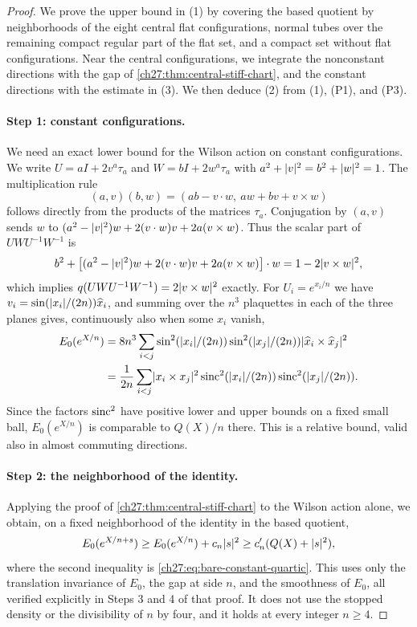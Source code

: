 \begin{proof}
We prove the upper bound in (1) by covering the based quotient by neighborhoods of the eight central flat configurations, normal tubes over the remaining compact regular part of the flat set, and a compact set without flat configurations. Near the central configurations, we integrate the nonconstant directions with the gap of \cref{ch27:thm:central-stiff-chart}, and the constant directions with the estimate in (3). We then deduce (2) from (1), (P1), and (P3).

\paragraph{Step 1: constant configurations.}
We need an exact lower bound for the Wilson action on constant configurations. We write $U=aI+2v^a\tau_a$ and $W=bI+2w^a\tau_a$ with $a^2+\lvert v\rvert^2=b^2+\lvert w\rvert^2=1$. The multiplication rule
\[
 (a,v)(b,w)=(ab-v\cdot w,\ aw+bv+v\times w)
\]
follows directly from the products of the matrices $\tau_a$. Conjugation by $(a,v)$ sends $w$ to $(a^2-\lvert v\rvert^2)w+2(v\cdot w)v+2a(v\times w)$. Thus the scalar part of $UWU^{-1}W^{-1}$ is
\[
 b^2+\bigl[(a^2-\lvert v\rvert^2)w+2(v\cdot w)v+2a(v\times w)\bigr]\cdot w=1-2\lvert v\times w\rvert^2,
\]
which implies $q(UWU^{-1}W^{-1})=2\lvert v\times w\rvert^2$ exactly. For $U_i=e^{x_i/n}$ we have $v_i=\sin(\lvert x_i\rvert/(2n))\widehat x_i$, and summing over the $n^3$ plaquettes in each of the three planes gives, continuously also when some $x_i$ vanish,
\begin{equation}\label{ch27:eq:bare-constant-quartic}
\begin{split}
 E_0(e^{X/n})&=8n^3\sum_{i<j}\sin^2(\lvert x_i\rvert/(2n))\sin^2(\lvert x_j\rvert/(2n))\lvert \widehat x_i\times\widehat x_j\rvert^2\\
 &=\frac1{2n}\sum_{i<j}\lvert x_i\times x_j\rvert^2\operatorname{sinc}^2(\lvert x_i\rvert/(2n))\operatorname{sinc}^2(\lvert x_j\rvert/(2n)).
\end{split}
\end{equation}
Since the factors $\operatorname{sinc}^2$ have positive lower and upper bounds on a fixed small ball, $E_0(e^{X/n})$ is comparable to $Q(X)/n$ there. This is a relative bound, valid also in almost commuting directions.

\paragraph{Step 2: the neighborhood of the identity.}
Applying the proof of \cref{ch27:thm:central-stiff-chart} to the Wilson action alone, we obtain, on a fixed neighborhood of the identity in the based quotient,
\begin{equation}\label{ch27:eq:central-bare-bound}
 E_0(e^{X/n+s})\ge E_0(e^{X/n})+c_n\lvert s\rvert^2\ge c_n'(Q(X)+\lvert s\rvert^2),
\end{equation}
where the second inequality is \eqref{ch27:eq:bare-constant-quartic}. This uses only the translation invariance of $E_0$, the gap at side $n$, and the smoothness of $E_0$, all verified explicitly in Steps 3 and 4 of that proof. It does not use the stopped density or the divisibility of $n$ by four, and it holds at every integer $n\ge4$.


\end{proof}

